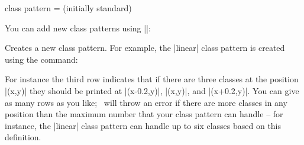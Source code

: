 \begin{sseqdata}[name = basic, cohomological Serre grading]
\begin{key}{class pattern =  (initially standard)}
\begin{codeexample}[width = 5cm]
\printpage[ name = class pattern example, class pattern = standard ]
\printpage[ name = class pattern example, change classes = blue,
    class pattern = linear, class placement transform = { rotate = 45 } ]
\end{codeexample}

You can add new class patterns using |\SseqNewClassPattern|:
\begin{command}{\SseqNewClassPattern{}}
Creates a new class pattern. For example, the |linear| class pattern is created
using the command:
\begin{codeexample}
\end{codeexample}
For instance the third row indicates that if there are three classes at the
position |(x,y)| they should be printed at |(x-0.2,y)|, |(x,y)|, and
|(x+0.2,y)|. You can give as many rows as you like; \sseqpages\  will throw an
error if there are more classes in any position than the maximum number that
your class pattern can handle -- for instance, the |linear| class pattern can
handle up to six classes based on this definition.
\end{command}
\end{key}



\end{sseqdata}
